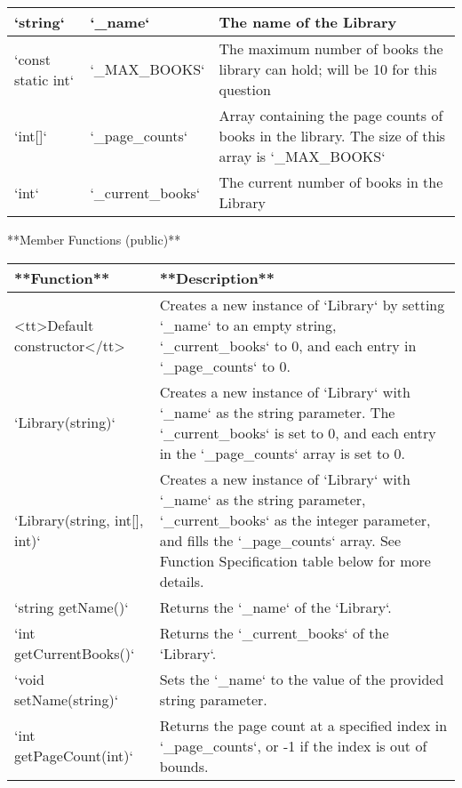 {{{{{{{{{{{\begin{longtable}{|p{1.5in}|p{1.5in}|p{2.9in}|}
`string` & `_name` & The name of the Library \\ \hline

`const static int` & `_MAX_BOOKS` & The maximum number of books the library can hold; will be 10 for this question \\ \hline

`int[]` & `_page_counts` & Array containing the page counts of books in the library. The size of this array is `_MAX_BOOKS` \\ \hline

`int` & `_current_books` & The current number of books in the Library \\ \hline

\end{longtable}

**Member Functions (public)**

\renewcommand{\arraystretch}{1.5} 
\begin{longtable}{|p{2.0in}|p{4.0in}|}
\hline
**Function** & **Description** \\ \hline

<tt>Default constructor</tt> & Creates a new instance of `Library` by setting `_name` to an empty string, `_current_books` to 0, and each entry in `_page_counts` to 0. \\ \hline

`Library(string)` & Creates a new instance of `Library` with `_name` as the string parameter. The `_current_books` is set to 0, and each entry in the `_page_counts` array is set to 0. \\ \hline

`Library(string, int[], int)` & Creates a new instance of `Library` with `_name` as the string parameter, `_current_books` as the integer parameter, and fills the `_page_counts` array. See Function Specification table below for more details. \\ \hline

`string getName()` & Returns the `_name` of the `Library`. \\ \hline

`int getCurrentBooks()` & Returns the `_current_books` of the `Library`. \\ \hline

`void setName(string)` & Sets the `_name` to the value of the provided string parameter. \\ \hline

`int getPageCount(int)` & Returns the page count at a specified index in `_page_counts`, or -1 if the index is out of bounds. \\ \hline


\end{longtable}}}}}}}}}}}}
